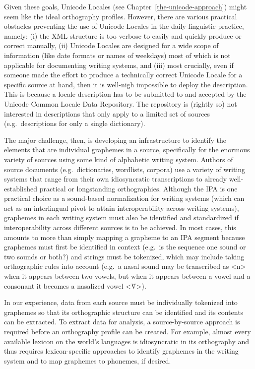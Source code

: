 Given these goals, Unicode Locales (see
Chapter~\ref{the-unicode-approach}) might seem like the ideal orthography
profiles. However, there are various practical obstacles preventing the use of
Unicode Locales in the daily linguistic practice, namely: (i) the
XML structure is too verbose to easily and quickly produce or correct manually,
(ii) Unicode Locales are designed for a wide scope of information (like date
formats or names of weekdays) most of which is not applicable for documenting
writing systems, and (iii) most crucially, even if someone made the effort to
produce a technically correct Unicode Locale for a specific source at hand,
then it is well-nigh impossible to deploy the description. This is because a locale
description has to be submitted to and accepted by the Unicode Common Locale
Data Repository. The repository is (rightly so) not interested in descriptions
that only apply to a limited set of sources (e.g.~descriptions for only a single
dictionary).

The major challenge, then, is developing an infrastructure to identify the
elements that are individual graphemes in a source, specifically for the
enormous variety of sources using some kind of alphabetic writing system.
Authors of source documents (e.g.~dictionaries, wordlists, corpora) use a
variety of writing systems that range from their own idiosyncratic
transcriptions to already well-established practical or longstanding
orthographies. Although the IPA is one practical choice as a sound-based
normalization for writing systems (which can act as an interlingual pivot to
attain interoperability across writing systems), graphemes in each writing
system must also be identified and standardized if interoperability across
different sources is to be achieved. In most cases, this amounts to more than
simply mapping a grapheme to an IPA segment because graphemes must first be
identified in context (e.g.~is the sequence one sound or two sounds or both?)
and strings must be tokenized, which may include taking orthographic rules into
account (e.g.~a nasal sound may be transcribed as <n> when it appears between 
two vowels, but when it appears between a vowel and a consonant it becomes 
a nasalized vowel <Ṽ>).

In our experience, data from each source must be
individually tokenized into graphemes so that its orthographic structure can be 
identified and its contents can be extracted. To extract data for analysis, a
source-by-source approach is required before an orthography profile can be
created. For example, almost every available lexicon on the world's languages is
idiosyncratic in its orthography and thus requires lexicon-specific approaches
to identify graphemes in the writing system and to map graphemes to phonemes, if
desired.

